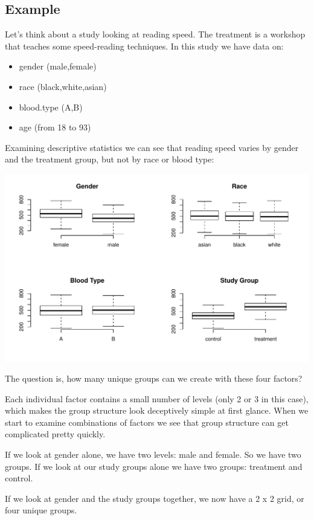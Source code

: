 \documentclass[]{book}
\providecommand{\tightlist}{%
  \setlength{\itemsep}{0pt}\setlength{\parskip}{0pt}}
\theoremstyle{definition}
\theoremstyle{definition}
\theoremstyle{definition}
\theoremstyle{remark}
\begin{document}
\hypertarget{example}{%
\subsection{Example}\label{example}}

Let's think about a study looking at reading speed. The treatment is a
workshop that teaches some speed-reading techniques. In this study we
have data on:

\begin{itemize}
\tightlist
\item
  gender (male,female)
\item
  race (black,white,asian)
\item
  blood.type (A,B)
\item
  age (from 18 to 93)
\end{itemize}

Examining descriptive statistics we can see that reading speed varies by
gender and the treatment group, but not by race or blood type:

\begin{center}\includegraphics[width=0.7\linewidth]{DS4PS-I_files/figure-latex/unnamed-chunk-147-1} \end{center}

The question is, how many unique groups can we create with these four
factors?

Each individual factor contains a small number of levels (only 2 or 3 in
this case), which makes the group structure look deceptively simple at
first glance. When we start to examine combinations of factors we see
that group structure can get complicated pretty quickly.

If we look at gender alone, we have two levels: male and female. So we
have two groups. If we look at our study groups alone we have two
groups: treatment and control.

If we look at gender and the study groups together, we now have a 2 x 2
grid, or four unique groups.
\end{document}
